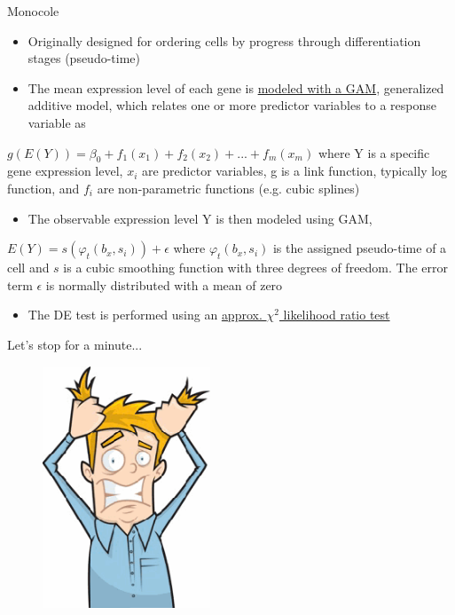 \documentclass{beamer}\usepackage[]{graphicx}\usepackage[]{color}
\begin{document}
\begin{frame}
\begin{block}{Monocole}
\vspace{0.5cm}
\scriptsize
\begin{itemize}
\item Originally designed for ordering cells by progress through differentiation stages (pseudo-time)
\item The mean expression level of each gene is \underline{modeled with a GAM}, generalized additive model, which relates one or more predictor variables to a response variable as
\end{itemize}
   \begin{center}
    $g(E(Y))=\beta_0+f_1(x_1)+f_2(x_2)+...+f_m(x_m)$ where Y is a specific gene expression level, $x_i$ are predictor variables, g is a link function, typically log function, and $f_i$ are non-parametric functions (e.g. cubic splines)
  \end{center}
\begin{itemize}
\item The observable expression level Y is then modeled using GAM,
\end{itemize}
$E(Y)=s(\varphi_t(b_x, s_i))+\epsilon$ where $\varphi_t(b_x, s_i)$ is the assigned pseudo-time of a cell and $s$ is a cubic smoothing function with three degrees of freedom. The error term $\epsilon$ is normally distributed with a mean of zero
\begin{itemize}
\item The DE test is performed using an \underline{approx. $\chi^2$ likelihood ratio test}
\end{itemize}
\end{block}
\end{frame}

\begin{frame}
Let's stop for a minute...
\begin{center}
\begin{figure}
\includegraphics[width=5cm]{Images/frustration.png}
\end{figure}
\end{center}
\end{frame}
\end{document}
